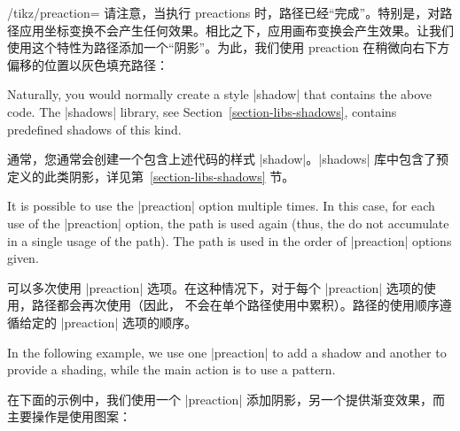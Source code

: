 \begin{key}{/tikz/preaction=}
    请注意，当执行 preactions 时，路径已经“完成”。特别是，对路径应用坐标变换不会产生任何效果。相比之下，应用画布变换会产生效果。让我们使用这个特性为路径添加一个“阴影”。为此，我们使用 preaction 在稍微向右下方偏移的位置以灰色填充路径：

\begin{codeexample}[]
\end{codeexample}

    Naturally, you would normally create a style |shadow| that contains the
    above code. The |shadows| library, see Section~\ref{section-libs-shadows},
    contains predefined shadows of this kind.

    通常，您通常会创建一个包含上述代码的样式 |shadow|。|shadows| 库中包含了预定义的此类阴影，详见第~\ref{section-libs-shadows} 节。


    It is possible to use the |preaction| option multiple times. In this case,
    for each use of the |preaction| option, the path is used again (thus, the
     do not accumulate in a single usage of the path). The path
    is used in the order of |preaction| options given.

    可以多次使用 |preaction| 选项。在这种情况下，对于每个 |preaction| 选项的使用，路径都会再次使用（因此， 不会在单个路径使用中累积）。路径的使用顺序遵循给定的 |preaction| 选项的顺序。


    In the following example, we use one |preaction| to add a shadow and
    another to provide a shading, while the main action is to use a pattern.
    
    在下面的示例中，我们使用一个 |preaction| 添加阴影，另一个提供渐变效果，而主要操作是使用图案：

\begin{codeexample}[preamble={\usetikzlibrary{patterns}}]
\end{codeexample}


\end{key}
